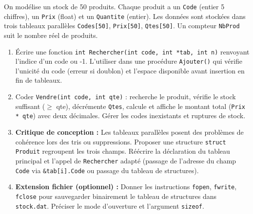 \documentclass[11pt]{article}
\begin{document}
\begin{exercice}
On modélise un stock de 50 produits. Chaque produit a un \texttt{Code} (entier 5 chiffres), un \texttt{Prix} (float) et un \texttt{Quantite} (entier). Les données sont stockées dans trois tableaux parallèles \texttt{Codes[50]}, \texttt{Prix[50]}, \texttt{Qtes[50]}. Un compteur \texttt{NbProd} suit le nombre réel de produits.
\begin{enumerate}
    \item Écrire une fonction \texttt{int Rechercher(int code, int *tab, int n)} renvoyant l'indice d'un code ou -1. L'utiliser dans une procédure \texttt{Ajouter()} qui vérifie l'unicité du code (erreur si doublon) et l'espace disponible avant insertion en fin de tableaux.
    \item Coder \texttt{Vendre(int code, int qte)} : recherche le produit, vérifie le stock suffisant ($\ge$ qte), décrémente \texttt{Qtes}, calcule et affiche le montant total (\texttt{Prix * qte}) avec deux décimales. Gérer les codes inexistants et ruptures de stock.
    \item \textbf{Critique de conception :} Les tableaux parallèles posent des problèmes de cohérence lors des tris ou suppressions. Proposer une structure \texttt{struct Produit} regroupent les trois champs. Réécrire la déclaration du tableau principal et l'appel de \texttt{Rechercher} adapté (passage de l'adresse du champ \texttt{Code} via \texttt{\&tab[i].Code} ou passage du tableau de structures).
    \item \textbf{Extension fichier (optionnel) :} Donner les instructions \texttt{fopen}, \texttt{fwrite}, \texttt{fclose} pour sauvegarder binairement le tableau de structures dans \texttt{stock.dat}. Préciser le mode d'ouverture et l'argument \texttt{sizeof}.
\end{enumerate}
\end{exercice}
\end{document}
